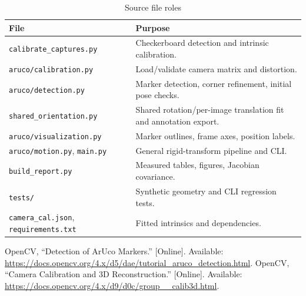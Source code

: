 \documentclass[conference,letterpaper]{IEEEtran}
\newcommand{\code}[1]{\nolinkurl{#1}}
\begin{document}
\begin{table}[ht]\centering\small\caption{Source file roles}
\begin{tabular}{L{.42\columnwidth}L{.48\columnwidth}}\toprule
File & Purpose\\\midrule
\code{calibrate_captures.py} & Checkerboard detection and intrinsic calibration.\\
\code{aruco/calibration.py} & Load/validate camera matrix and distortion.\\
\code{aruco/detection.py} & Marker detection, corner refinement, initial pose checks.\\
\code{shared_orientation.py} & Shared rotation/per-image translation fit and annotation export.\\
\code{aruco/visualization.py} & Marker outlines, frame axes, position labels.\\
\code{aruco/motion.py}, \code{main.py} & General rigid-transform pipeline and CLI.\\
\code{build_report.py} & Measured tables, figures, Jacobian covariance.\\
\code{tests/} & Synthetic geometry and CLI regression tests.\\
\code{camera_cal.json}, \code{requirements.txt} & Fitted intrinsics and dependencies.\\\bottomrule
\end{tabular}\end{table}
\begin{thebibliography}{2}
 OpenCV, ``Detection of ArUco Markers.'' [Online]. Available: \url{https://docs.opencv.org/4.x/d5/dae/tutorial_aruco_detection.html}.
 OpenCV, ``Camera Calibration and 3D Reconstruction.'' [Online]. Available: \url{https://docs.opencv.org/4.x/d9/d0c/group__calib3d.html}.
\end{thebibliography}
\end{document}
